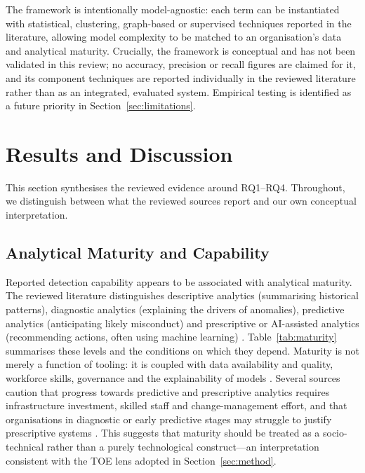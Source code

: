 \documentclass[conference]{IEEEtran}
\begin{document}
The framework is intentionally model-agnostic: each term can be instantiated with statistical, clustering, graph-based or supervised techniques reported in the literature, allowing model complexity to be matched to an organisation's data and analytical maturity. Crucially, the framework is conceptual and has not been validated in this review; no accuracy, precision or recall figures are claimed for it, and its component techniques are reported individually in the reviewed literature rather than as an integrated, evaluated system. Empirical testing is identified as a future priority in Section~\ref{sec:limitations}.

\section{Results and Discussion}
\label{sec:results}

This section synthesises the reviewed evidence around RQ1--RQ4. Throughout, we distinguish between what the reviewed sources report and our own conceptual interpretation.

\subsection{Analytical Maturity and Capability}
\label{sec:maturity}

Reported detection capability appears to be associated with analytical maturity. The reviewed literature distinguishes descriptive analytics (summarising historical patterns), diagnostic analytics (explaining the drivers of anomalies), predictive analytics (anticipating likely misconduct) and prescriptive or AI-assisted analytics (recommending actions, often using machine learning) \cite{b31,b26}. Table~\ref{tab:maturity} summarises these levels and the conditions on which they depend. Maturity is not merely a function of tooling: it is coupled with data availability and quality, workforce skills, governance and the explainability of models \cite{b32,b33}. Several sources caution that progress towards predictive and prescriptive analytics requires infrastructure investment, skilled staff and change-management effort, and that organisations in diagnostic or early predictive stages may struggle to justify prescriptive systems \cite{b34}. This suggests that maturity should be treated as a socio-technical rather than a purely technological construct---an interpretation consistent with the TOE lens adopted in Section~\ref{sec:method}.
\end{document}
